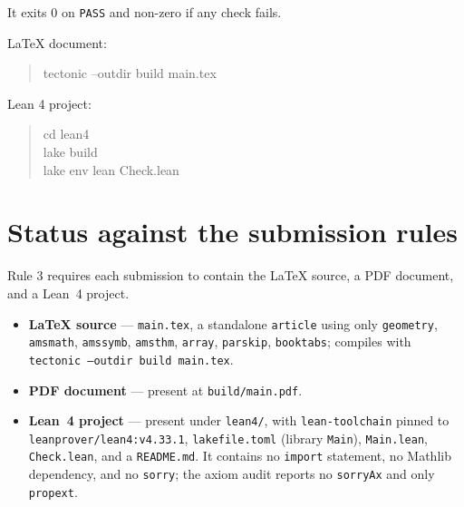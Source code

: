 \documentclass[11pt]{article}
\theoremstyle{definition}
\theoremstyle{remark}
\begin{document}
It exits $0$ on \texttt{PASS} and non-zero if any check fails.

LaTeX document:

\begin{quote}\ttfamily
tectonic --outdir build main.tex
\end{quote}

Lean 4 project:

\begin{quote}\ttfamily
cd lean4\\
lake build\\
lake env lean Check.lean
\end{quote}

\section*{Status against the submission rules}

Rule 3 requires each submission to contain the LaTeX source, a PDF document,
and a Lean~4 project.

\begin{itemize}
\item \textbf{LaTeX source} --- \texttt{main.tex}, a standalone \texttt{article}
  using only \texttt{geometry}, \texttt{amsmath}, \texttt{amssymb},
  \texttt{amsthm}, \texttt{array}, \texttt{parskip}, \texttt{booktabs};
  compiles with \texttt{tectonic --outdir build main.tex}.
\item \textbf{PDF document} --- present at \texttt{build/main.pdf}.
\item \textbf{Lean~4 project} --- present under \texttt{lean4/}, with
  \texttt{lean-toolchain} pinned to \texttt{leanprover/lean4:v4.33.1},
  \texttt{lakefile.toml} (library \texttt{Main}), \texttt{Main.lean},
  \texttt{Check.lean}, and a \texttt{README.md}. It contains no \texttt{import}
  statement, no Mathlib dependency, and no \texttt{sorry}; the axiom audit
  reports no \texttt{sorryAx} and only \texttt{propext}.
\end{itemize}
\end{document}
